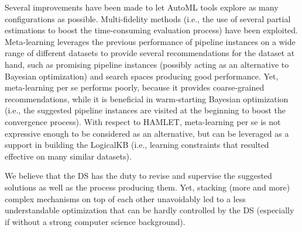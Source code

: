 \documentclass[5p,times]{elsarticle}
\begin{document}
Several improvements have been made to let AutoML tools explore as many configurations as possible.
Multi-fidelity methods \cite{falkner2018bohb} (i.e., the use of several partial estimations to boost the time-consuming evaluation process) have been exploited. 
Meta-learning leverages the previous performance of pipeline instances on a wide range of different datasets to provide several recommendations for the dataset at hand, such as promising pipeline instances (possibly acting as an alternative to Bayesian optimization) and search spaces producing good performance.
Yet, meta-learning per se performs poorly, because it provides coarse-grained recommendations, while it is beneficial in warm-starting Bayesian optimization (i.e., the suggested pipeline instances are visited at the beginning to boost the convergence process).
With respect to HAMLET, meta-learning per se is not expressive enough to be considered as an alternative, but can be leveraged as a support in building the LogicalKB (i.e., learning constraints that resulted effective on many similar datasets).

We believe that the DS has the duty to revise and supervise the suggested solutions as well as the process producing them.
Yet, stacking (more and more) complex mechanisms on top of each other unavoidably led to a less understandable optimization that can be hardly controlled by the DS (especially if without a strong computer science background).
\end{document}
